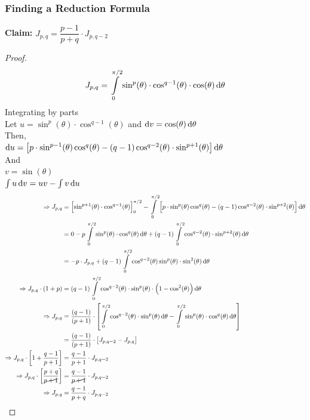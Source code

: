 \documentclass[14]{article}
\theoremstyle{definition}
\theoremstyle{case}
\begin{document}
\subsubsection*{Finding a Reduction Formula}
\textbf{Claim: } $J_{p, q} = \dfrac{p-1}{p+q} \cdot J_{p, q-2}$
\begin{proof}
\begin{align*}
J_{p, q}&= \int\limits_0^{\pi/2} \sin^p(\theta) \cdot \cos^{q-1}(\theta) \cdot \cos(\theta) \dif \theta\\
\end{align*}
Integrating by parts\\
Let $u = \sin^{p}(\theta) \cdot \cos^{q-1}(\theta)$ and $\dif v = \cos(\theta) \dif \theta$\\
Then,\\
$\dif u = \left[ p \cdot \sin^{p-1}(\theta) \cos^q(\theta) - (q-1) \cos^{q-2}(\theta) \cdot \sin^{p+1}(\theta) \right] \dif \theta$\\
And\\
$v = \sin(\theta)$\\
$\int u \dif v = uv - \int v \dif u$
\begin{align*}
\Rightarrow J_{p, q} &= \left[\sin^{p+1}(\theta) \cdot \cos^{q-1}(\theta) \right]_0^{\pi/2} - \int\limits_0^{\pi/2} \left[ p \cdot \sin^{p}(\theta) \cos^q(\theta) - (q-1) \cos^{q-2}(\theta) \cdot \sin^{p+2}(\theta) \right] \dif \theta\\
&= 0 - p \int\limits_0^{\pi/2}\sin^p(\theta) \cdot \cos^{q}(\theta) \dif \theta + (q-1)\int\limits_0^{\pi/2}\cos^{q-2}(\theta) \cdot \sin^{p+2}(\theta) \dif\theta\\
&= -p \cdot J_{p, q} + (q-1) \int\limits_0^{\pi/2} \cos^{q-2}(\theta)\sin^{p}(\theta) \cdot \sin^2(\theta) \dif \theta\\
\Rightarrow J_{p,q} \cdot (1+p) &= (q-1) \int\limits_0^{\pi/2} \cos^{q-2}(\theta) \cdot \sin^{p} (\theta) \cdot \left( 1 - \cos^2(\theta)\right) \dif \theta\\
\Rightarrow J_{p,q} &= \dfrac{(q-1)}{(p+1)} \cdot \left[ \int\limits_0^{\pi/2} \cos^{q-2}(\theta) \cdot \sin^{p}(\theta) \dif \theta - \int\limits_0^{\pi/2} \sin^p(\theta)\cdot \cos^q(\theta) \dif \theta \right]\\
&=\dfrac{(q-1)}{(p+1)} \cdot \left[ J_{p, q-2} - J_{p, q} \right]\\
\Rightarrow J_{p, q} \cdot \left[ 1 + \dfrac{q-1}{p+1} \right] &= \dfrac{q-1}{p+1} \cdot J_{p, q-2}\\
\Rightarrow J_{p, q} \cdot \left[ \dfrac{p+q}{\cancel{p+1}} \right] &= \dfrac{q-1}{\cancel{p+1}} \cdot J_{p, q-2}\\
\Rightarrow J_{p, q} &= \dfrac{q-1}{p+q} \cdot J_{p, q-2}
\end{align*}
\end{proof}
\end{document}
